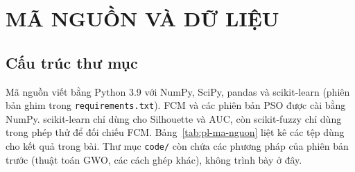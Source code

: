 \chapter{MÃ NGUỒN VÀ DỮ LIỆU}
\label{app:code}

\section*{Cấu trúc thư mục}

Mã nguồn viết bằng Python 3.9 với NumPy, SciPy, pandas và scikit-learn (phiên bản ghim trong
\texttt{requirements.txt}). FCM và các phiên bản PSO được cài bằng NumPy. scikit-learn chỉ dùng cho Silhouette và AUC, còn
scikit-fuzzy chỉ dùng trong phép thử để đối chiếu FCM. Bảng~\ref{tab:pl-ma-nguon} liệt kê các tệp dùng cho kết quả trong
bài. Thư mục \texttt{code/} còn chứa các phương pháp của phiên bản trước (thuật toán GWO, các cách ghép khác), không trình bày ở đây.

